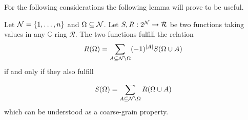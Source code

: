 \documentclass[10pt, a4paper]{amsart}
\begin{document}

For the following considerations the following lemma will prove to be useful. 

\begin{lemma}\label{lemma:ROMEGA_AND_SOMEGA}
Let $\mathcal{N} = \{1, \ldots , n\}$ and $\Omega \subseteq \mathcal{N} $. Let $S,R : 2^{\mathcal{N}}\to \mathcal{R}$ be two functions taking values in any $\mathbb{C}$ ring $\mathcal{R}$. The two functions fulfill the relation
\begin{align}\label{Prop:ROmega_presentation}
R(\Omega)=\sum_{A\subseteq \mathcal{N}\backslash \Omega } (-1)^{|A|}S(\Omega \cup A)
\end{align}
if and only if they also fulfill  

\begin{align}\label{S_Omega_R_representation}
S(\Omega) = 
\sum_{A\subseteq \mathcal{N}\backslash \Omega } R(\Omega\cup A)
\end{align}
which can be understood as a coarse-grain property. 
\end{lemma}
\end{document}
